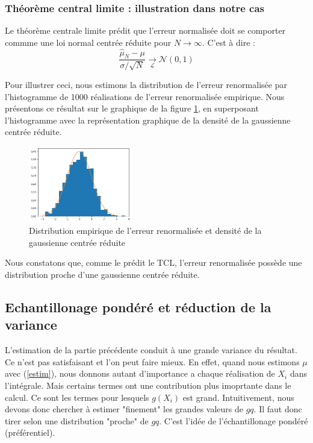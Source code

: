 \documentclass{article}
\begin{document}
\subsubsection{Théorème central limite : illustration dans notre cas}

Le théorème centrale limite prédit que l'erreur normalisée doit se comporter commme une loi 
normal centrée réduite pour $N \rightarrow \infty$. C'est à dire : 
\[\frac {\hat{\mu}_{N}-\mu }{\sigma /{\sqrt {N}}}\underset{\mathcal{L} }{\longrightarrow}\mathcal{N} (0,1)\]

Pour illustrer ceci, nous estimons la distribution de l'erreur renormalisée
par l'histogramme de 1000 réalisations de l'erreur renormalisée empirique. Nous présentons
ce résultat sur le graphique de la figure \ref{TP1_MC_TCL}, en superposant l'histogramme avec la représentation graphique de la densité de la gaussienne centrée réduite.
\begin{figure}[ht]
\centering
\includegraphics[width=0.4\textwidth]{TP1/MC_brute_TCL.png}
\caption{Distribution empirique de l'erreur renormalisée et densité de la gaussienne centrée réduite}
\label{TP1_MC_TCL}
\end{figure}

Nous constatons que, comme le prédit le TCL, l'erreur renormalisée possède une distribution proche d'une gaussienne centrée réduite.



\subsection{Echantillonage pondéré et réduction de la variance}
L'estimation de la partie précédente conduit à une grande variance du résultat.
Ce n'est pas satisfaisant et l'on peut faire mieux. En effet, quand nous estimons 
$\mu$ avec (\ref{estim}), nous donnons autant d'importance a chaque réalisation
de $X_{i}$ dans l'intégrale. Mais certains termes ont une contribution plus
imoprtante dans le calcul. Ce sont les termes pour lesquels
$g(X_{i})$ est grand. Intuitivement, nous devons donc chercher à estimer "finement" les grandes valeurs de $gq$. Il faut donc 
tirer selon une distribution "proche" de $gq$. C'est l'idée de l'échantillonage pondéré (préférentiel).\\
\end{document}
